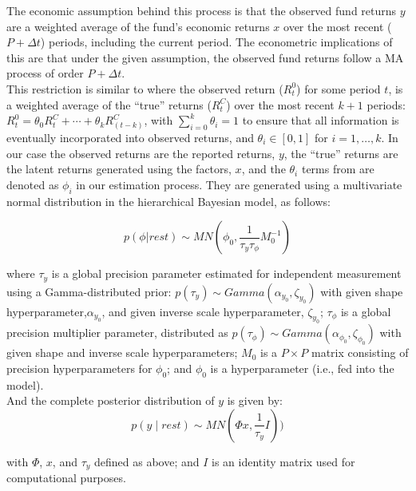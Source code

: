 \documentclass[11pt]{article}
\begin{document}
The economic assumption behind this process is that the observed fund returns $y$ are a weighted average of the fund’s economic returns $x$ over the most recent ($P + \Delta t$) periods, including the current period. The econometric implications of this are that under the given assumption, the observed fund returns follow a MA process of order $P + \Delta t$. \\

This restriction is similar to \cite{getmansky_etal} where the observed return ($R_t^0$) for some period $t$, is a weighted average of the 	``true'' returns ($R_t^C$) over the most recent $k+1$ periods: $R_t^0 = \theta_0 R_t^C + \cdots + \theta_k R_(t-k)^C$, with $\sum_{i=0}^k \theta_i  = 1$ to ensure that all information is eventually incorporated into observed returns, and $\theta_i \in [0,1]$ for $i = 1, \ldots, k$. In our case the observed returns are the reported returns, $y$, the ``true'' returns are the latent returns generated using the factors, $x$, and the $\theta_i$ terms from \cite{getmansky_etal} are denoted as $\phi_i$ in our estimation process. They are generated using a multivariate normal distribution in the hierarchical Bayesian model, as follows:

\begin{equation}
\label{eq:phi_dist}
	p\left(\phi|rest\right) \sim MN\left(\phi_{0},\frac{1}{\tau_{y}\tau_{\phi}}M_{0}^{-1}\right)
\end{equation}

where $\tau_y$ is a global precision parameter estimated for independent measurement using a Gamma-distributed prior: $p( \tau_y ) \sim Gamma \left( \alpha_{y_0}, \zeta_{y_0} \right)$ with given shape hyperparameter,$\alpha_{y_0}$, and given inverse scale hyperparameter, $\zeta_{y_0}$;  $\tau_\phi$ is a global precision multiplier parameter, distributed as $p( \tau_\phi ) \sim Gamma \left(\alpha_{\phi_0}, \zeta_{\phi_0} \right)$ with given shape and inverse scale hyperparameters; $M_0$ is a $P \times P$ matrix consisting of precision hyperparameters for $\phi_0$; and $\phi_0$ is a hyperparameter (i.e., fed into the model). \\

And the complete posterior distribution of $y$ is given by:
\begin{equation}
\label{eq:y_dist}
	p \left( y \mid rest \right) \sim MN \left( \Phi x,\frac{1}{\tau_{y}}I\right))
\end{equation}

with $\Phi$, $x$, and $\tau_y$ defined as above; and $I$ is an identity matrix used for computational purposes.
\end{document}
